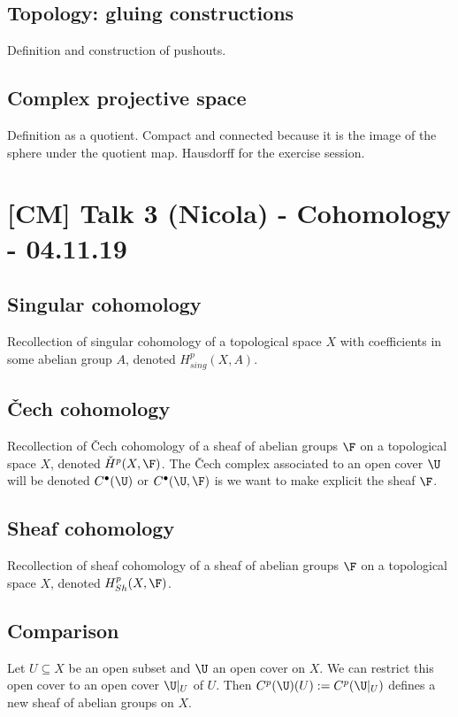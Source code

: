 \documentclass[A4paper, british]{amsart}
\theoremstyle{darkgreentheorem}
\theoremstyle{darkbluedefinition}
\theoremstyle{darkredexample}
\theoremstyle{remark}
\newcommand{\1}{\mathbbm{1}}
\newcommand{\grd}{^{\bullet}}
\begin{document}
\subsection{Topology: gluing constructions}

Definition and construction of pushouts.

\subsection{Complex projective space}

Definition as a quotient.
Compact and connected because it is the image of the sphere under the quotient map.
Hausdorff for the exercise session.

\section{[CM] Talk 3 (Nicola) - Cohomology - 04.11.19}

\subsection{Singular cohomology}

Recollection of singular cohomology of a topological space $X$ with coefficients in some abelian group $A$, denoted $H^{p}_{sing}(X,A)$.

\subsection{\v{C}ech cohomology}

Recollection of \v{C}ech cohomology of a sheaf of abelian groups $\F$ on a topological space $X$, denoted $\check{H}^{p}(X,\F)$.
The \v{C}ech complex associated to an open cover $\U$ will be denoted $C\grd(\U)$ or $C\grd(\U,\F)$ is we want to make explicit the sheaf $\F$.

\subsection{Sheaf cohomology}

Recollection of sheaf cohomology of a sheaf of abelian groups $\F$ on a topological space $X$, denoted $H^{p}_{Sh}(X,\F)$.

\subsection{Comparison}

Let $U\subseteq X$ be an open subset and $\U$ an open cover on $X$.
We can restrict this open cover to an open cover $\U|_{U}$ of $U$.
Then $C^{p}(\U)(U):=C^{p}(\U|_{U})$ defines a new sheaf of abelian groups on $X$.
\end{document}
